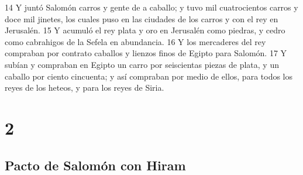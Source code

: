  
14 Y juntó Salomón carros y gente de a caballo; y tuvo mil cuatrocientos carros y doce mil jinetes, los cuales puso en las ciudades de los carros y con el rey en Jerusalén.
15 Y acumuló el rey plata y oro en Jerusalén como piedras, y cedro como cabrahigos de la Sefela en abundancia.
16 Y los mercaderes del rey compraban por contrato caballos y lienzos finos de Egipto para Salomón. 
17 Y subían y compraban en Egipto un carro por seiscientas piezas de plata, y un caballo por ciento cincuenta; y así compraban por medio de ellos, para todos los reyes de los heteos, y para los reyes de Siria.

\chapter{2}

\section*{Pacto de Salomón con Hiram }



